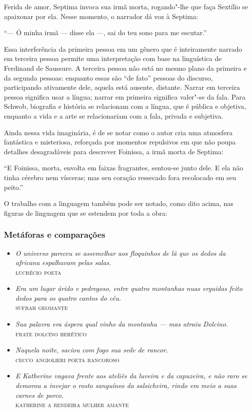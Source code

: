\documentclass[12pt]{extarticle}
\begin{document}
Ferida de amor, Septima invoca sua irmã morta, rogando"-lhe que faça
Sextílio se apaixonar por ela. Nesse momento, o narrador dá voz à
Septima:

\smallskip
``--- Ó minha irmã --- disse ela ---, sai do teu sono para me escutar.''
\smallskip

Essa interferência da primeira pessoa em um gênero que é inteiramente
narrado em terceira pessoa permite uma interpretação com base na
linguística de Ferdinand de Saussure. A terceira pessoa não está no
mesmo plano da primeira e da segunda pessoas: enquanto essas são ``de
fato'' pessoas do discurso, participando ativamente dele, aquela está
ausente, distante. Narrar em terceira pessoa significa usar a língua;
narrar em primeira significa valer"-se da fala. Para Schwob, biografia e
história se relacionam com a língua, que é pública e objetiva, enquanto
a vida e a arte se relacionariam com a fala, privada e subjetiva.

Ainda nessa vida imaginária, é de se notar como o autor cria uma
atmosfera fantástica e misteriosa, reforçada por momentos repulsivos em
que não poupa detalhes desagradáveis para descrever Foinissa, a irmã
morta de Septima:

\smallskip
``E Foinissa, morta, envolta em faixas fragrantes, sentou-se junto dele.
E ela não tinha cérebro nem vísceras; mas seu coração ressecado fora
recolocado em seu peito.''
\smallskip

O trabalho com a linguagem também pode ser notado, como dito acima, nas
figuras de linguagem que se estendem por toda a obra:

\subsubsection{Metáforas e comparações}

\begin{itemize}
\item\emph{O universo pareceu se assemelhar aos floquinhos de lã que os
dedos da africana espalhavam pelas salas.}\\
\textsc{lucrécio poeta}

\item\emph{Era um lugar árido e pedregoso, entre quatro montanhas nuas
erguidas feito dedos para os quatro cantos do céu.}\\
\textsc{sufrah geomante}

\item\emph{Sua palavra era áspera qual vinho da montanha --- mas atraiu
Dolcino.}\\
\textsc{frate dolcino herético}

\item\emph{Naquela noite, saciou com fogo sua sede de rancor.}\\ 
\textsc{cecco angiolieri poeta rancoroso}

\item\emph{E Katherine vagava frente aos ateliês da luveira e da capuzeira,
e não raro se demorou a invejar o rosto sanguíneo da salsicheira, rindo
em meio a suas carnes de porco.}\\
\textsc{katherine a rendeira mulher amante}
\end{itemize}
\end{document}
